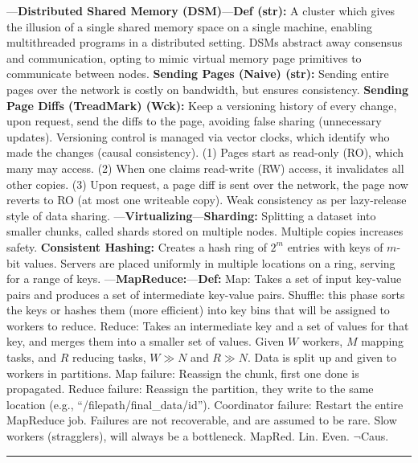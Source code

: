 \begin{multicols}{2}

\noindent
---\textbf{Distributed Shared Memory (DSM)}---\textbf{Def (str):} A cluster which gives the 
illusion of a single shared memory space on a single machine, enabling multithreaded programs in a 
distributed setting. DSMs abstract away consensus and communication, opting to mimic virtual memory page primitives 
to communicate between nodes. \textbf{Sending Pages (Naive) (str):} Sending entire pages over the network is costly on bandwidth, but ensures consistency.
\textbf{Sending Page Diffs (TreadMark) (Wck):} Keep a versioning history of every change, upon request, send the diffs to the page, avoiding false sharing (unnecessary updates).
Versioning control is managed via vector clocks, which identify who made the changes (causal consistency). (1) Pages start as read-only (RO), which
many may access. (2) When one claims read-write (RW) access, it invalidates all other copies. (3) Upon request, a page diff is sent over the network,
the page now reverts to RO (at most one writeable copy). Weak consistency as per lazy-release style of data sharing.
---\textbf{Virtualizing}---\textbf{Sharding:} Splitting a dataset into smaller chunks, called shards stored on multiple nodes. Multiple copies increases
safety. \textbf{Consistent Hashing:} Creates a hash ring of $2^m$ entries with keys of $m$-bit values. Servers 
are placed uniformly in multiple locations on a ring, serving for a range of keys.
---\textbf{MapReduce:}---\textbf{Def:} Map: Takes a set of input key-value pairs and produces a set of intermediate key-value
pairs. Shuffle: this phase sorts the keys or hashes them (more efficient) into key bins that will be assigned to workers to reduce. Reduce: Takes an intermediate key and a set of values for that key, and merges them
into a smaller set of values. Given $W$ workers, $M$ mapping tasks, and $R$ reducing tasks, $W \gg N$ and $R \gg N$.  Data is split up and given 
to workers in partitions.
Map failure: Reassign the chunk, first one done is propagated. 
Reduce failure: Reassign the partition, they write to the same location (e.g., ``/filepath/final\_data/id'').
Coordinator failure: Restart the entire MapReduce job. Failures are not recoverable, and are assumed to be rare.
Slow workers (stragglers), will always be a bottleneck.
MapRed. Lin. Even. $\neg$Caus.


\noindent
\rule{\linewidth}{0.4pt}\\


\end{multicols}
